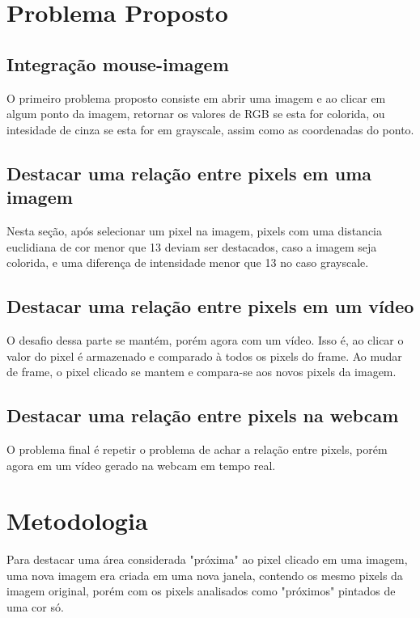 \documentclass{bmvc2k}
\begin{document}
\section{Problema Proposto}

\subsection{Integração mouse-imagem}
O primeiro problema proposto consiste em abrir uma imagem e ao clicar em algum ponto da imagem, retornar os valores de RGB se esta for colorida, ou intesidade de cinza se esta for em grayscale, assim como as coordenadas do ponto.

 \cite{splitshapemerge}
 \cite{MouseCallback}

\subsection{Destacar uma relação entre pixels em uma imagem}
Nesta seção, após selecionar um pixel na imagem, pixels com uma distancia euclidiana de cor menor que 13 deviam ser destacados, caso a imagem seja colorida, e uma diferença de intensidade menor que 13 no caso grayscale.

\cite{colorspaces}

\subsection{Destacar uma relação entre pixels em um vídeo}
O desafio dessa parte se mantém, porém agora com um vídeo. Isso é, ao clicar o valor do pixel é armazenado e comparado à todos os pixels do frame. Ao mudar de frame, o pixel clicado se mantem e compara-se aos novos pixels da imagem.

\subsection{Destacar uma relação entre pixels na webcam}
O problema final é repetir o problema de achar a relação entre pixels, porém agora em um vídeo gerado na webcam em tempo real.

\section{Metodologia}
 

Para destacar uma área considerada "próxima" ao pixel clicado em uma imagem, uma nova imagem era criada em uma nova janela, contendo os mesmo pixels da imagem original, porém com os pixels analisados como "próximos" pintados de uma cor só.
\end{document}

